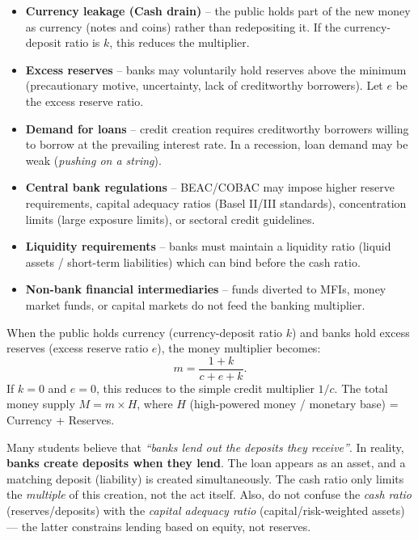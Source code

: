 \documentclass[11pt]{article}
\newcommand{\cle}[1]{{\popxbold\color{popdark}#1}}
\begin{document}
\begin{aretenir}
\begin{itemize}
\item \textbf{Currency leakage (Cash drain)} – the public holds part of the new money as currency (notes and coins) rather than redepositing it. If the currency-deposit ratio is $k$, this reduces the multiplier.
\item \textbf{Excess reserves} – banks may voluntarily hold reserves above the minimum (precautionary motive, uncertainty, lack of creditworthy borrowers). Let $e$ be the excess reserve ratio.
\item \textbf{Demand for loans} – credit creation requires creditworthy borrowers willing to borrow at the prevailing interest rate. In a recession, loan demand may be weak (\emph{pushing on a string}).
\item \textbf{Central bank regulations} – BEAC/COBAC may impose higher reserve requirements, capital adequacy ratios (Basel II/III standards), concentration limits (large exposure limits), or sectoral credit guidelines.
\item \textbf{Liquidity requirements} – banks must maintain a liquidity ratio (liquid assets / short-term liabilities) which can bind before the cash ratio.
\item \textbf{Non-bank financial intermediaries} – funds diverted to MFIs, money market funds, or capital markets do not feed the banking multiplier.
\end{itemize}
\end{aretenir}

\begin{propriete}
When the public holds currency (currency-deposit ratio $k$) and banks hold excess reserves (excess reserve ratio $e$), the \cle{money multiplier} becomes:
\[
m = \frac{1 + k}{c + e + k}.
\]
If $k = 0$ and $e = 0$, this reduces to the simple credit multiplier $1/c$. The total money supply $M = m \times H$, where $H$ (high-powered money / monetary base) = Currency + Reserves.
\end{propriete}

\begin{attention}
Many students believe that \emph{``banks lend out the deposits they receive''}. In reality, \textbf{banks create deposits when they lend}. The loan appears as an asset, and a matching deposit (liability) is created simultaneously. The cash ratio only limits the \emph{multiple} of this creation, not the act itself. Also, do not confuse the \emph{cash ratio} (reserves/deposits) with the \emph{capital adequacy ratio} (capital/risk-weighted assets) — the latter constrains lending based on equity, not reserves.
\end{attention}
\end{document}
